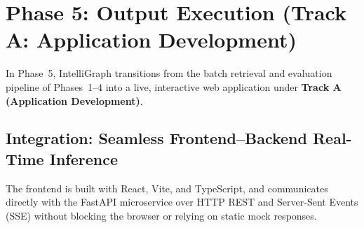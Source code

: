 \documentclass[11pt,a4paper]{article}
\begin{document}
\begin{abstract}
General-purpose language models frequently answer user questions from parametric memory, producing unverifiable claims without source provenance. \textbf{IntelliGraph} addresses this problem by combining dense semantic vector retrieval (\texttt{pgvector} over local 384-dimensional \texttt{all-MiniLM-L6-v2} embeddings \cite{reimers2019sbert,wang2020minilm}) with structured entity co-occurrence graph traversal (Neo4j) in a grounded Retrieval-Augmented Generation (RAG) architecture \cite{lewis2020rag}. Across our 48-question golden benchmark, Hybrid retrieval at the selected operating point ($K=5$) achieves 92.7\% evidence recall, 0.729 Mean Reciprocal Rank (MRR), and 0.761 AUC-ROC, outperforming isolated Vector-Only (83.3\% recall) and Graph-Only (31.2\% recall) baselines. In Deliverable~3 (Phases~5 and~6), we transition this pipeline into a production-ready web application under \textbf{Track A (Application Development)}, featuring a React + TypeScript frontend communicating with a FastAPI backend over Server-Sent Events (SSE) \cite{sse}, real-time multi-format source ingestion (PDF, DOCX, TXT, URLs, and pasted text), validated inline citations with section headings, an explicit ``The sources don't say.'' refusal state, a retrieval-only fallback when the LLM is unavailable, and a containerized Docker Compose deployment.
\end{abstract}

\tableofcontents
\newpage

\setcounter{section}{4}

\section{Phase 5: Output Execution (Track A: Application Development)}

In Phase~5, IntelliGraph transitions from the batch retrieval and evaluation pipeline of Phases~1--4 into a live, interactive web application under \textbf{Track A (Application Development)}.

\subsection{Integration: Seamless Frontend--Backend Real-Time Inference}
The frontend is built with React, Vite, and TypeScript, and communicates directly with the FastAPI microservice over HTTP REST and Server-Sent Events (SSE) \cite{sse} without blocking the browser or relying on static mock responses.
\end{document}
